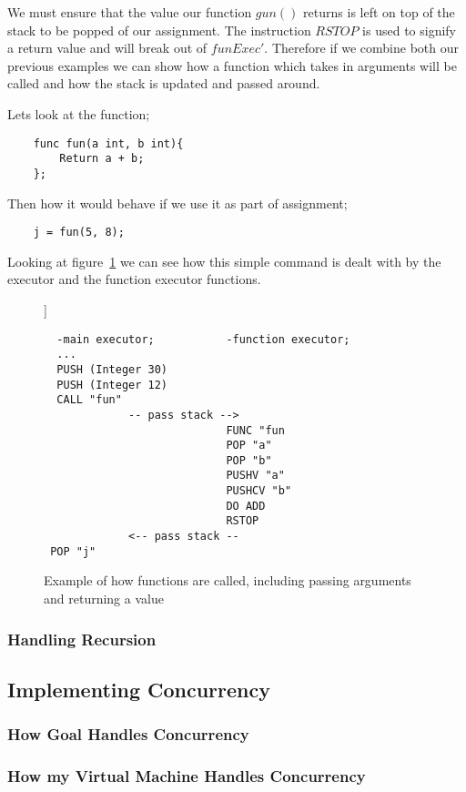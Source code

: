 We must ensure that the value our function $gun()$ returns is left on top of the stack to be popped of our assignment. The instruction $RSTOP$ is used to signify a return value and will break out of $funExec'$. Therefore if we combine both our previous examples we can show how a function which takes in arguments will be called and how the stack is updated and passed around.

Lets look at the function;

\begin{lstlisting}
	func fun(a int, b int){
		Return a + b;
	};
\end{lstlisting}

Then how it would behave if we use it as part of assignment;

\begin{lstlisting}
	j = fun(5, 8);
\end{lstlisting}

Looking at figure~\ref{fig:stackFrame} we can see how this simple command is dealt with by the executor and the function executor functions. 

\begin{figure}[h]]
\centering
\begin{lstlisting}
  -main executor;           -function executor;
  ...
  PUSH (Integer 30)
  PUSH (Integer 12)
  CALL "fun"
             -- pass stack --> 
                            FUNC "fun  
                            POP "a"
                            POP "b"
                            PUSHV "a"
                            PUSHCV "b"
                            DO ADD
                            RSTOP
             <-- pass stack --
 POP "j"                               
\end{lstlisting}
\caption{Example of how functions are called, including passing arguments and returning a value}
\label{fig:stackFrame}
\end{figure}
\subsubsection{Handling Recursion}

\subsection{Implementing Concurrency}

\subsubsection{How Goal Handles Concurrency}

\subsubsection{How my Virtual Machine Handles Concurrency}



